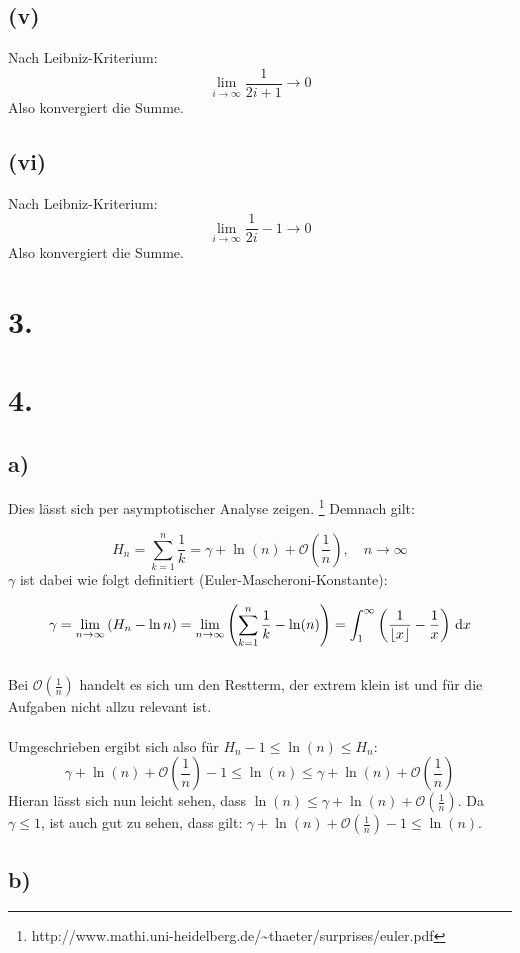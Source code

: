 \documentclass[a4paper]{scrartcl}
\begin{document}
\subsection{(v)}
Nach Leibniz-Kriterium:
\[ \lim_{i\to\infty} \frac 1 {2i+1} \rightarrow 0 \]
Also konvergiert die Summe.

\subsection{(vi)}
Nach Leibniz-Kriterium:
\[ \lim_{i\to\infty} \frac 1 {2i} - 1 \rightarrow 0 \]
Also konvergiert die Summe.

\section{3.}

\section{4.}
\subsection{a)}
Dies lässt sich per asymptotischer Analyse zeigen. \footnote{http://www.mathi.uni-heidelberg.de/\textasciitilde thaeter/surprises/euler.pdf}
Demnach gilt:

\[H_n=\sum_{k=1}^n \frac{1}{k} = \gamma + \ln (n) +\mathcal O\!\left(\frac 1{n}\right),\quad n\to\infty \]
%
\(\gamma\) ist dabei wie folgt definitiert (Euler-Mascheroni-Konstante):

\[ \gamma = \lim_{n\to\infty} \left(H_n - \ln n\right) = \lim_{n \rightarrow \infty } \left(\sum_{k=1}^n \frac{1}{k} - \ln(n) \right)=\int_1^\infty\left({1\over\lfloor x\rfloor}-{1\over x}\right)\,\mathrm dx \] \\
%
Bei \(\mathcal O\!\left(\frac 1{n}\right)\) handelt es sich um den Restterm, der extrem klein ist und für die Aufgaben nicht allzu relevant ist. \\ \\
%
Umgeschrieben ergibt sich also für \(H_n -1 \leq \ln (n) \leq H_n \):
\[ \gamma + \ln (n) +\mathcal O\!\left(\frac 1{n}\right) -1 \leq \ln (n) \leq \gamma + \ln (n) +\mathcal O\!\left(\frac 1{n}\right)\]
%
Hieran lässt sich nun leicht sehen, dass \( \ln (n) \leq \gamma + \ln (n) +\mathcal O\!\left(\frac 1{n}\right) \). Da \(\gamma \leq 1\), ist auch gut zu sehen, dass gilt: \( \gamma + \ln (n) +\mathcal O\!\left(\frac 1{n}\right) -1 \leq \ln (n) \).

\subsection{b)}
\end{document}
